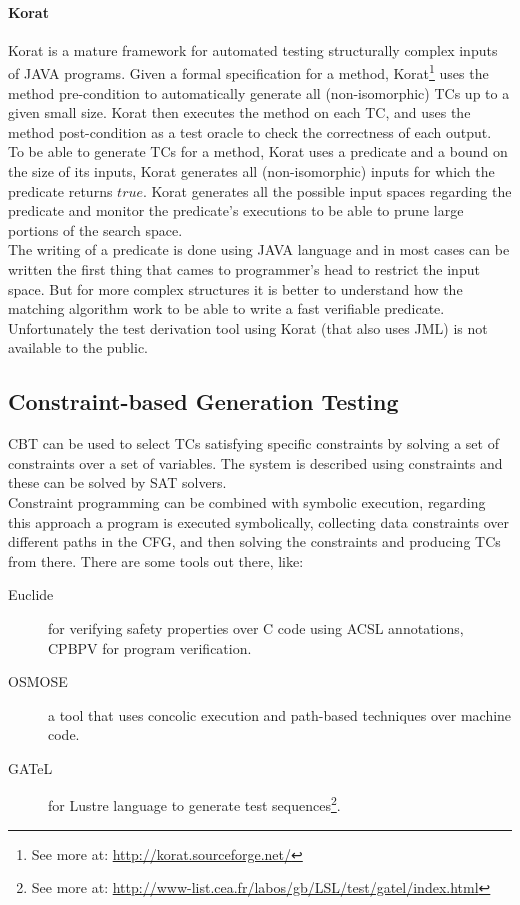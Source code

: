 \paragraph{Korat}
Korat\cite{Boyapati02korat:automated} is a mature framework for automated testing structurally complex inputs of JAVA programs.
Given a formal specification for a method, Korat\footnote{See more at: \url{http://korat.sourceforge.net/}} uses the method pre-condition
to automatically generate all (non-isomorphic) \ac{TC}s up to a given small size.
Korat then executes the method on each \ac{TC}, and uses the method post-condition as a test oracle to check the correctness of each output.\\
To be able to generate \ac{TC}s for a method, Korat uses a predicate and a bound on the size of its inputs,
Korat generates all (non-isomorphic) inputs for which the predicate returns $true$.
Korat generates all the possible input spaces regarding the predicate and monitor the predicate's executions to be able to prune large portions of the search space.\\
\indent The writing of a predicate is done using JAVA language and in most cases can be written the first thing that cames to programmer's head to restrict the input space.
But for more complex structures it is better to understand how the matching algorithm work to be able to write a fast verifiable predicate.\\
Unfortunately the test derivation tool using Korat (that also uses \ac{JML}) is not available to the public.

\subsection{Constraint-based Generation Testing}
\ac{CBT}\cite{DeMillo91constraint-basedautomatic} can be used to select \ac{TC}s satisfying specific constraints by
solving a set of constraints over a set of variables. The system is described using constraints and these can be solved by \ac{SAT} solvers.\\
Constraint programming can be combined with symbolic execution, regarding this approach a program is executed symbolically,
collecting data constraints over different paths in the \ac{CFG}, and then solving the constraints and producing \ac{TC}s from there.
There are some tools out there, like:

\begin{description}
\item[Euclide] for verifying safety properties over C code using \ac{ACSL} annotations, CPBPV for program verification.
\item[OSMOSE] a tool that uses concolic execution and path-based techniques over machine code.
\item[GATeL] for Lustre language to generate test sequences\footnote{See more at: \url{http://www-list.cea.fr/labos/gb/LSL/test/gatel/index.html}}.
\end{description}

